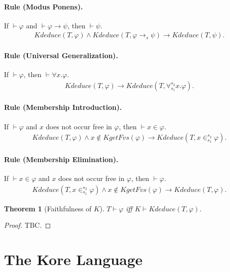 \documentclass[UTF8]{article}
\newcounter{thmcounter}
\theoremstyle{plain}
\newtheorem{theorem}[thmcounter]{Theorem}
\theoremstyle{definition}
\theoremstyle{remark}
\newcommand{\kimplies}{\to}
\newcommand{\kforall}{\forall}
\newcommand{\kin}{\in}
\newcommand{\KgetFvs}{\mathit{KgetFvs}}
\newcommand{\Kdeduce}{\mathit{Kdeduce}}
\begin{document}
\paragraph{Rule (Modus Ponens).}
If $\vdash \varphi$ and $\vdash \varphi \to \psi$, then $\vdash \psi$.
\begin{align*}
\Kdeduce(T, \varphi) \wedge \Kdeduce(T, \varphi \kimplies_s \psi) \to 
\Kdeduce(T, \psi).
\end{align*}

\paragraph{Rule (Universal Generalization).}
If $\vdash \varphi$, then $\vdash \forall x . \varphi$.
\begin{align*}
\Kdeduce(T, \varphi) \to \Kdeduce(T, \kforall_{s_1}^{s_2} x . \varphi).
\end{align*}

\paragraph{Rule (Membership Introduction).}
If $\vdash \varphi$ and $x$ does not occur free in $\varphi$, then $\vdash x \in \varphi$.
\begin{align*}
\Kdeduce(T, \varphi) \wedge x \not\in \KgetFvs(\varphi) \to \Kdeduce(T, x 
\kin_{s_1}^{s_2} \varphi).
\end{align*}

\paragraph{Rule (Membership Elimination).}
If $\vdash x \in \varphi$ and $x$ does not occur free in $\varphi$, then $\vdash \varphi$.
\begin{align*}
\Kdeduce(T, x \kin_{s_1}^{s_2} \varphi) \wedge x \not\in \KgetFvs(\varphi) \to 
\Kdeduce(T, \varphi).
\end{align*}

\begin{theorem}[Faithfulness of $K$]
	$T \vdash \varphi$ iff $K \vdash \Kdeduce(T, \varphi)$.
\end{theorem}
\begin{proof}
	TBC.
\end{proof}

\section{The Kore Language}
\end{document}
